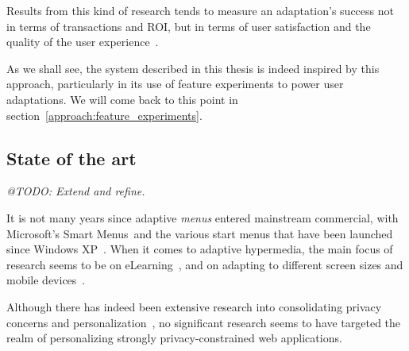     Results from this kind of research tends to measure an adaptation's success not in terms of transactions and ROI, but in terms of user satisfaction and the quality of the user experience~\cite{Gajos2006,Findlater2008}.

    As we shall see, the system described in this thesis is indeed inspired by this approach, particularly in its use of feature experiments to power user adaptations. We will come back to this point in section~\ref{approach:feature_experiments}.

  \subsection{State of the art}

    \emph{@TODO: Extend and refine.}

    It is not many years since adaptive \emph{menus} entered mainstream commercial, with Microsoft's Smart Menus\texttrademark\ and the various start menus that have been launched since Windows XP~\cite{Gajos2006}. When it comes to adaptive hypermedia, the main focus of research seems to be on eLearning~\cite{Vrieze}, and on adapting to different screen sizes and mobile devices~\cite{Findlater2008}.

    Although there has indeed been extensive research into consolidating privacy concerns and personalization~\cite{Kobsa2007,Wang2012,Knijnenburg2013}, no significant research seems to have targeted the realm of personalizing strongly privacy-constrained web applications.
